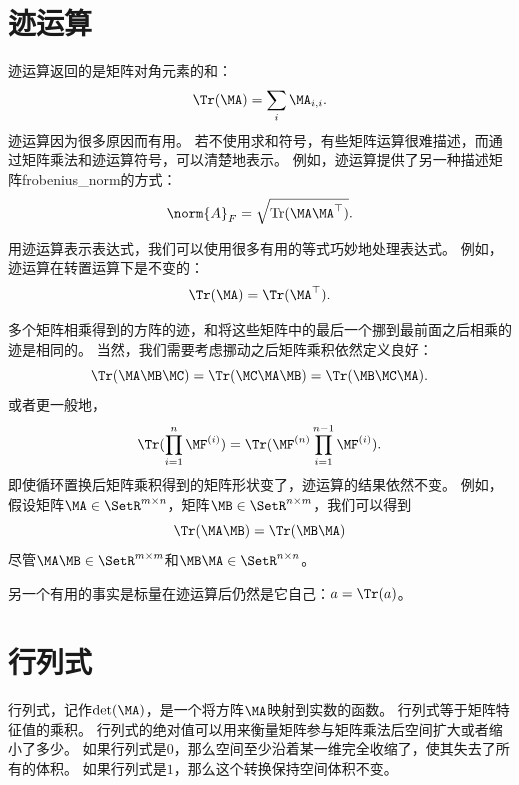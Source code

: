 \section{迹运算}
\label{sec:the_trace_operator}

迹运算返回的是矩阵对角元素的和：
\begin{equation}
    \Tr(\MA)= \sum_i \MA_{i,i}.
\end{equation}
迹运算因为很多原因而有用。
若不使用求和符号，有些矩阵运算很难描述，而通过矩阵乘法和迹运算符号，可以清楚地表示。
例如，迹运算提供了另一种描述矩阵\gls{frobenius_norm}的方式：
\begin{equation}
    \norm{A}_F = \sqrt{\text{Tr}(\MA \MA^\top)}.
    \label{eq:2.49}
\end{equation}


用迹运算表示表达式，我们可以使用很多有用的等式巧妙地处理表达式。
例如，迹运算在转置运算下是不变的：
\begin{equation}
    \Tr(\MA)=\Tr(\MA^\top).
\end{equation}


多个矩阵相乘得到的方阵的迹，和将这些矩阵中的最后一个挪到最前面之后相乘的迹是相同的。
当然，我们需要考虑挪动之后矩阵乘积依然定义良好：
\begin{equation}
\Tr(\MA\MB\MC)=\Tr(\MC\MA\MB)= \Tr(\MB\MC\MA).
\end{equation}
或者更一般地，
\begin{equation} 
\Tr(\prod_{i=1}^n \MF^{(i)})= \Tr(\MF^{(n)} \prod_{i=1}^{n-1} \MF^{(i)}).
\label{eq:2.52}
\end{equation}
即使循环置换后矩阵乘积得到的矩阵形状变了，迹运算的结果依然不变。
例如，假设矩阵$\MA\in \SetR^{m\times n}$，矩阵$\MB\in \SetR^{n\times m}$，我们可以得到
\begin{equation} 
    \Tr(\MA\MB)= \Tr(\MB\MA)
\end{equation}
尽管$\MA\MB \in \SetR^{m\times m}$和$\MB\MA \in \SetR^{n\times n}$。



另一个有用的事实是标量在迹运算后仍然是它自己：$a=\Tr(a)$。




\section{行列式}
\label{sec:the_determinant}

行列式，记作$\text{det}(\MA)$，是一个将方阵$\MA$映射到实数的函数。
行列式等于矩阵特征值的乘积。
行列式的绝对值可以用来衡量矩阵参与矩阵乘法后空间扩大或者缩小了多少。
如果行列式是$0$，那么空间至少沿着某一维完全收缩了，使其失去了所有的体积。
如果行列式是$1$，那么这个转换保持空间体积不变。




